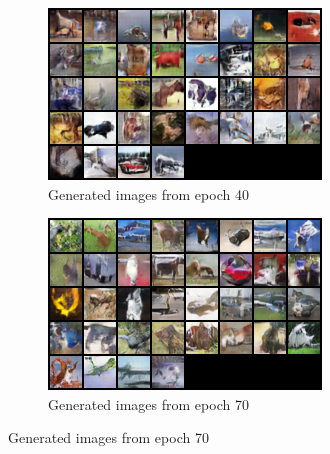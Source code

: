 \begin{figure}[H]
    \centering
    \begin{subfigure}[t]{0.48\textwidth}
        \centering
        \includegraphics[width=\textwidth]{images/ex_2/try_2/epoch_40}
        \caption{Generated images from epoch 40}
    \end{subfigure}
    \begin{subfigure}[t]{0.48\textwidth}
        \centering
        \includegraphics[width=\textwidth]{images/ex_2/try_2/epoch_70}
        \caption{Generated images from epoch 70}
    \end{subfigure}
    \hfill
\end{figure}



